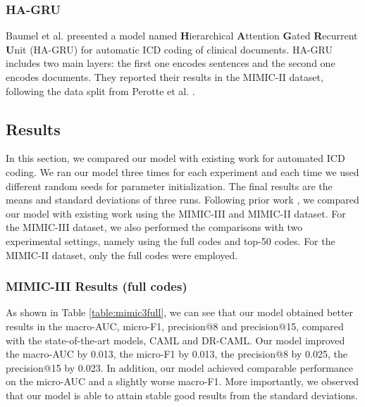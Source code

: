 \documentclass[letterpaper]{article} \usepackage{aaai20}  \usepackage{times}  \usepackage{helvet} \usepackage{courier}  \usepackage[hyphens]{url}  \usepackage{graphicx} \urlstyle{rm} \def\UrlFont{\rm}  \usepackage{graphicx}  \frenchspacing  \setlength{\pdfpagewidth}{8.5in}  \setlength{\pdfpageheight}{11in}
\begin{document}
\subsubsection{HA-GRU}
Baumel et al.  presented a model named \textbf{H}ierarchical \textbf{A}ttention \textbf{G}ated \textbf{R}ecurrent \textbf{U}nit (HA-GRU) for automatic ICD coding of clinical documents. HA-GRU includes two main layers: the first one encodes sentences and the second one encodes documents. They reported their results in the MIMIC-II dataset, following the data split from Perotte et al. .

\subsection{Results}
In this section, we compared our model with existing work for automated ICD coding. We ran our model three times for each experiment and each time we used different random seeds for parameter initialization. The final results are the means and standard deviations of three runs. Following prior work \cite{mullenbach2018explainable}, we compared our model with existing work using the MIMIC-III and MIMIC-II dataset. For the MIMIC-III dataset, we also performed the comparisons with two experimental settings, namely using the full codes and top-50 codes. For the MIMIC-II dataset, only the full codes were employed.

\subsubsection{MIMIC-III Results (full codes)}


As shown in Table \ref{table:mimic3full}, we can see that our model obtained better results in the macro-AUC, micro-F1, precision@8 and precision@15, compared with the state-of-the-art models, CAML and DR-CAML. Our model improved the macro-AUC by 0.013, the micro-F1 by 0.013, the precision@8 by 0.025, the precision@15 by 0.023. In addition, our model achieved comparable performance on the micro-AUC and a slightly worse macro-F1. More importantly, we observed that our model is able to attain stable good results from the standard deviations.
\end{document}
